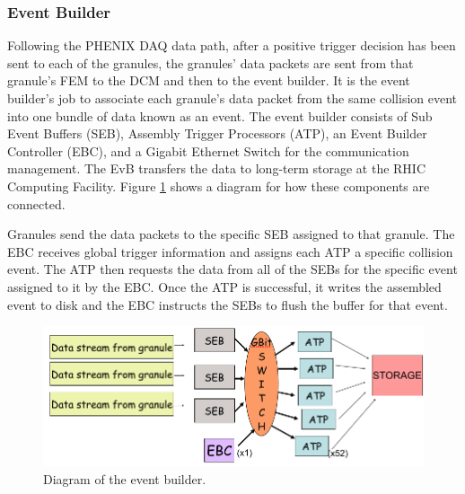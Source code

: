 
\subsubsection{Event Builder}
Following the PHENIX DAQ data path, after a positive trigger decision has been sent to each of the granules, the granules' data packets are sent from that granule's FEM to the DCM and then to the event builder. It is the event builder's job to associate each granule's data packet from the same collision event into one bundle of data known as an event. The event builder consists of Sub Event Buffers (SEB), Assembly Trigger Processors (ATP), an Event Builder Controller (EBC), and a Gigabit Ethernet Switch for the communication management. The EvB transfers the data to long-term storage at the RHIC Computing Facility. Figure \ref{fig:evb_diag} shows a diagram for how these components are connected.

Granules send the data packets to the specific SEB assigned to that granule. The EBC receives global trigger information and assigns each ATP a specific collision event. The ATP then requests the data from all of the SEBs for the specific event assigned to it by the EBC. Once the ATP is successful, it writes the assembled event to disk and the EBC instructs the SEBs to flush the buffer for that event.

\begin{figure}[h!]
\centering
\includegraphics[width=0.73\linewidth]{figs/evb_diagram.png}
\caption{Diagram of the event builder. }\label{fig:evb_diag}
\end{figure}


